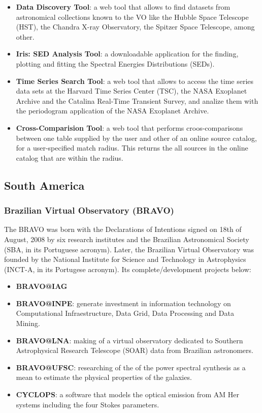 \begin{itemize}
\item \textbf{Data Discovery Tool}:
a web tool that allows to find datasets from astronomical collections known to
the VO like the Hubble Space Telescope (HST), the Chandra X-ray Observatory, the
Spitzer Space Telescope, among other.

\item \textbf{Iris: SED Analysis Tool}:
a downloadable application for the finding, plotting and fitting the Spectral
Energies Distributions (SEDs). 

\item \textbf{Time Series Search Tool}:
a web tool that allows to access the time series data sets at the Harvard Time
Series Center (TSC), the NASA Exoplanet Archive and the Catalina Real-Time
Transient Survey, and analize them with the periodogram application of the NASA
Exoplanet Archive.

\item \textbf{Cross-Comparision Tool}:
a web tool that performs croos-comparisons between one table supplied by the
user and other of an online source catalog, for a user-specified match radius.
This returns the all sources in the online catalog that are within the radius.
\end{itemize}

\subsection{South America}
\subsubsection{Brazilian Virtual Observatory (BRAVO)}
The BRAVO \cite{website:bravo-home} was born with the Declarations of Intentions
signed on 18th of August, 2008 by six research institutes and the Brazilian
Astronomical Society (SBA, in its Portuguese acronym). Later, the Brazilian
Virtual Observatory was founded by the National Institute for Science and
Technology in Astrophysics (INCT-A, in its Portugese acronym). Its
complete/development projects below:

\begin{itemize}
\item \textbf{BRAVO@IAG}

\item \textbf{BRAVO@INPE}:
generate investment in information technology on Computational Infraestructure,
Data Grid, Data Processing and Data Mining.

\item \textbf{BRAVO@LNA}:
making of a virtual observatory dedicated to Southern Astrophysical Research
Telescope (SOAR) data from Brazilian astronomers.  

\item \textbf{BRAVO@UFSC}:
researching of the of the power spectral synthesis as a mean to estimate the
physical properties of the galaxies.

\item \textbf{CYCLOPS}:
a software that models the optical emission from AM Her systems including the
four Stokes parameters.
\end{itemize}

